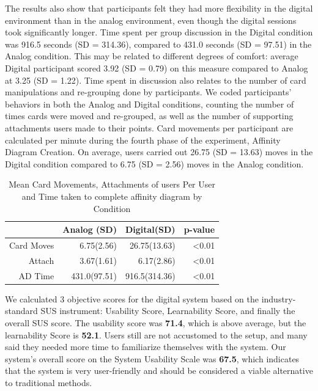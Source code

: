 \documentclass{sigchi}
\begin{document}
The results also show that participants felt they had more flexibility in the digital environment than in the analog environment, even though the digital sessions took significantly longer. Time spent per group discussion in the Digital condition was 916.5 seconds (SD = 314.36), compared to 431.0 seconds (SD = 97.51) in the Analog condition. This may be related to different degrees of comfort: average Digital participant scored 3.92 (SD = 0.79) on this measure compared to Analog at 3.25 (SD = 1.22). Time spent in discussion also relates to the number of card manipulations and re-grouping done by participants. We coded participants' behaviors in both the Analog and Digital conditions, counting the number of times cards were moved and re-grouped, as well as the number of supporting attachments users made to their points. Card movements per participant are calculated per minute during the fourth phase of the experiment, Affinity Diagram Creation. On average, users carried out 26.75 (SD = 13.63) moves in the Digital condition compared to 6.75 (SD = 2.56) moves in the Analog condition.

\begin{table}[ht]
\centering
\caption{Mean Card Movements, Attachments of users Per User and Time taken to complete affinity diagram by Condition}

\begin{tabular}{rrrr}
  \hline
& Analog (SD) & Digital(SD) & p-value \\ 
  \hline
  \hline
Card Moves  &    6.75(2.56)& 26.75(13.63)   &  \textless0.01    \\
Attach & 3.67(1.61)  &    6.17(2.86)    &  \textless0.01    \\
AD Time  &    431.0(97.51)   &      916.5(314.36)      &   \textless0.01    \\ 
\hline
\end{tabular}
\end{table}



We calculated 3 objective scores for the digital system based on the industry-standard SUS instrument: Usability Score, Learnability Score, and finally the overall SUS score. The usability score was \textbf{71.4}, which is above average, but the learnability Score is \textbf{52.1}. Users still are not accustomed to the setup, and many said they needed more time to familiarize themselves with the system. Our system's overall score on the System Usability Scale was \textbf{67.5}, which indicates that the system is very user-friendly and should be considered a viable alternative to traditional methods. 
\end{document}
